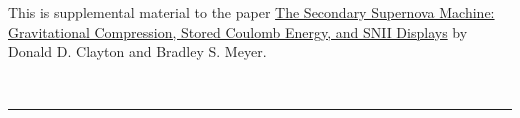 \documentclass{article}
\newcounter{counter}
\newcounter{table_counter}
\begin{document}
This is supplemental material to the paper
\href{http://www.sciencedirect.com/science/article/pii/S1387647316300057}{The Secondary Supernova Machine: Gravitational Compression,
Stored Coulomb Energy, and SNII Displays}
by Donald D. Clayton and Bradley S. Meyer.














\ \hrule
\end{document}
